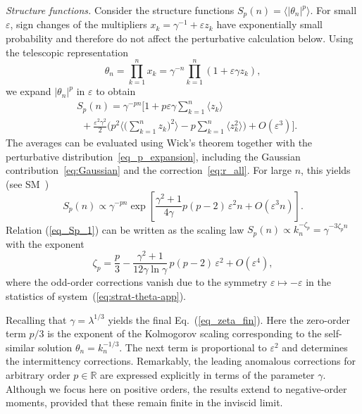 \documentclass[aps,twocolumn,superscriptaddress]{revtex4-2}
\begin{document}
\textit{Structure functions.}
Consider the structure functions \(S_p(n)=\langle|\theta_n|^p\rangle\). For small \(\varepsilon\), sign changes of the multipliers \(x_k=\gamma^{-1}+\varepsilon z_k\) have exponentially small probability and therefore do not affect the perturbative calculation below. Using the telescopic representation
\begin{equation}
\theta_n
= \prod_{k=1}^n x_k
= \gamma^{-n} \prod_{k=1}^n (1+\varepsilon \gamma z_k),
\end{equation}
we expand \(|\theta_n|^p\) in \(\varepsilon\) to obtain
\begin{equation}
\begin{aligned}
&S_p(n)
=
\gamma^{-pn}
\bigg[
1
+p\varepsilon\gamma\sum_{k=1}^n\langle z_k\rangle
\\
&\ \ +\frac{\varepsilon^2\gamma^2}{2}
\bigg(
p^2\Big\langle\Big(\sum_{k=1}^n z_k\Big)^2\Big\rangle
-p\sum_{k=1}^n\langle z_k^2\rangle
\bigg)
+O(\varepsilon^3)
\bigg].
\end{aligned}
\label{eq:Sp_prelim}
\end{equation}
The averages can be evaluated using Wick's theorem together with the perturbative distribution~\eqref{eq_p_expansion}, including the Gaussian contribution~\eqref{eq:Gaussian} and the correction~\eqref{eq:r_all}. For large \(n\), this yields (see SM~\cite[\S V]{SM})
\begin{equation}
S_p(n)\propto \gamma^{-pn}\exp\left[
\frac{\gamma^2+1}{4\gamma}p(p-2)\,\varepsilon^2 n
+O(\varepsilon^3 n)\right].
\label{eq_Sp_1}
\end{equation}
Relation (\ref{eq_Sp_1}) can be written as the scaling law \(S_p(n)\propto k_n^{-\zeta_p} = \gamma^{-3 \zeta_p n}\) with the exponent
\begin{equation}
\zeta_p
= \frac{p}{3}-\frac{\gamma^2+1}{12\gamma\ln\gamma}\,
p(p-2)\,\varepsilon^2
+O(\varepsilon^4),
\label{eq_zeta_fin_gamma}
\end{equation}
where the odd-order corrections vanish due to the symmetry \(\varepsilon\mapsto-\varepsilon\) in the statistics of system~(\ref{eq:strat-theta-app}).

Recalling that $\gamma = \lambda^{1/3}$ yields the final Eq.~(\ref{eq_zeta_fin}).  Here the zero-order term $p/3$ is the exponent of the Kolmogorov scaling corresponding to the self-similar solution $\theta_n = k_n^{-1/3}$.
The next term is proportional to $\varepsilon^2$ and determines the intermittency corrections.
Remarkably, the leading anomalous corrections for arbitrary order $p \in \mathbb{R}$ are expressed explicitly in terms of the parameter $\gamma$. Although we focus here on positive orders, the results extend to negative-order moments, provided that these remain finite in the inviscid limit.
\end{document}
